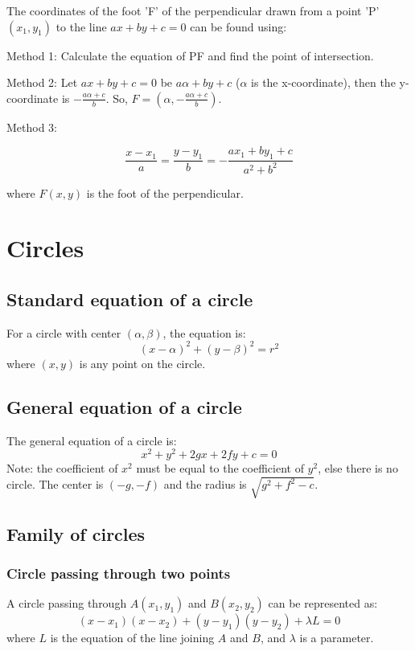 \documentclass{article}
\begin{document}
The coordinates of the foot 'F' of the perpendicular drawn from a point 'P' \((x_1, y_1)\) to the line \(ax + by + c = 0\) can be found using:

Method 1: Calculate the equation of PF and find the point of intersection.

Method 2: Let \(ax + by + c= 0\) be \(a\alpha + by + c\) (\(\alpha\) is the x-coordinate), then the y-coordinate is \(-\frac{a\alpha + c}{b}\). So, \(F = \left(\alpha, -\frac{a\alpha + c}{b}\right)\).

Method 3:

\begin{equation}
\frac{x - x_1}{a} = \frac{y - y_1}{b} = -\frac{ax_1 + by_1 + c}{a^2 + b^2}
\end{equation}

where \(F(x, y)\) is the foot of the perpendicular.

\section{Circles}

\subsection{Standard equation of a circle}
For a circle with center \((\alpha, \beta)\), the equation is:
\[
(x-\alpha)^2 + (y-\beta)^2 = r^2
\]
where \((x,y)\) is any point on the circle.

\subsection{General equation of a circle}
The general equation of a circle is:
\[
x^2+y^2+2gx+2fy+c = 0
\]
Note: the coefficient of \(x^2\) must be equal to the coefficient of \(y^2\), else there is no circle.
The center is \((-g, -f)\) and the radius is \(\sqrt{g^2+f^2-c}\).

\subsection{Family of circles}

\subsubsection{Circle passing through two points}
A circle passing through \(A(x_1, y_1)\) and \(B(x_2, y_2)\) can be represented as:
\[
(x-x_1)(x-x_2) + (y-y_1)(y-y_2) + \lambda L = 0
\]
where \(L\) is the equation of the line joining \(A\) and \(B\), and \(\lambda\) is a parameter.
\end{document}
